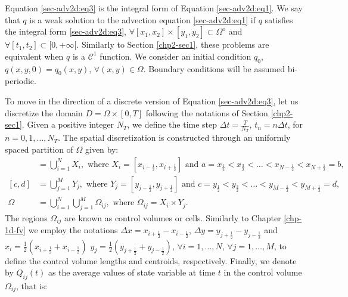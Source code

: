 Equation \eqref{sec-adv2d:eq3} is the integral form of Equation 
\eqref{sec-adv2d:eq1}. We say that ${q}$ is a weak
solution to the advection equation \eqref{sec-adv2d:eq1} if ${q}$
satisfies the integral form \eqref{sec-adv2d:eq3}, 
$\forall [x_1,x_2]\times[y_1,y_2] \subset \Omega^{\mathrm{o}}$ and 
$\forall [t_1,t_2] \subset [0,+\infty[$.
Similarly to Section \ref{chp2-sec1}, these problems are equivalent
when  ${q}$ is a $\mathcal{C}^1$ function.
We consider an initial condition ${q_0}$,
${q}(x,y,0) =  {q_0}(x,y)$, $\forall (x,y) \in \Omega$.
Boundary conditions will be assumed bi-periodic.

To move in the direction of a discrete version of Equation \eqref{sec-adv2d:eq3},
let us discretize the domain $D = \Omega \times [0,T]$ following 
the notations of Section \ref{chp2-sec1}.
Given a positive integer $N_T$, we define the time step 
$\Delta t = \frac{T}{N_T}$, $t_n = n \Delta t$, for $n = 0, 1 ,\ldots, N_T$.
The spatial discretization is constructed through an uniformly spaced partition of $\Omega$ given by:
\begin{align}
	[a,b] &= \bigcup_{i=1}^N X_i, 
	\text{ where } X_i= [x_{i-\frac{1}{2}}, x_{i+\frac{1}{2}}] \text{ and } 
	a = x_{\frac{1}{2}} < x_{\frac{3}{2}} < \ldots < x_{N-\frac{1}{2}} < x_{N+\frac{1}{2}} = b, \\
	[c,d] &= \bigcup_{j=1}^M Y_j, 
\text{ where } Y_j= [y_{j-\frac{1}{2}}, y_{j+\frac{1}{2}}] \text{ and } 
	c = y_{\frac{1}{2}} < y_{\frac{3}{2}} < \ldots < y_{M-\frac{1}{2}} < y_{M+\frac{1}{2}} = d, \\
    \Omega &=  \bigcup_{i=1}^N \bigcup_{j=1}^M \Omega_{ij}, \text{ where } \Omega_{ij} = X_i \times Y_j.
\end{align}
The regions $\Omega_{ij}$ are known as control volumes or cells. 
Similarly to  Chapter \ref{chp-1d-fv} we employ the notations
$\Delta x = x_{i+\frac{1}{2}} - x_{i-\frac{1}{2}}$,
$\Delta y = y_{j+\frac{1}{2}} - y_{j-\frac{1}{2}}$ 
and $x_i = \frac{1}{2}(x_{i+\frac{1}{2}} + x_{i-\frac{1}{2}})$
$y_j = \frac{1}{2}(y_{j+\frac{1}{2}} + y_{j-\frac{1}{2}})$, $\forall i = 1, \ldots, N$, 
$\forall j = 1, \ldots, M$,
to define the control volume lengths and centroids, respectively.
Finally, we denote by ${Q}_{ij}(t)$ as the
average values of state variable at time $t$
in the control volume $\Omega_{ij}$, that is:

